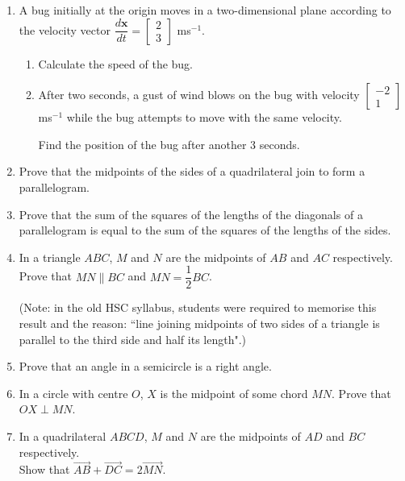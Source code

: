 \documentclass[11pt, a4paper, oneside]{exam}
\theoremstyle{definition}\newtheorem{define}{Definition}[section]
\theoremstyle{remark}\newtheorem{remark}{Remark}
\theoremstyle{definition}\newtheorem{example}{Example}[subsection]
\theoremstyle{definition}\newtheorem{notation}{Notation}[section]
\theoremstyle{definition}\newtheorem{theorem}{Theorem}[section]
\theoremstyle{definition}\newtheorem{corollary}{Corollary}[section]
\begin{document}
\begin{enumerate}
\item
A bug initially at the origin moves in a two-dimensional plane according to the velocity vector $\dfrac{d\mathbf{x}}{dt} = \left[ \begin{matrix}2\\3\end{matrix} \right]$ ms$^{-1}$.
\begin{enumerate}
  \item Calculate the speed of the bug.
  \item After two seconds, a gust of wind blows on the bug with velocity $\left[ \begin{matrix} -2\\1\end{matrix} \right]$ ms$^{-1}$ while the bug attempts to move with the same velocity.

  Find the position of the bug after another 3 seconds.
\end{enumerate}


\item Prove that the midpoints of the sides of a quadrilateral join to form a parallelogram.\\

\item Prove that the sum of the squares of the lengths of the diagonals of a parallelogram is equal to the sum of the squares of the lengths of the sides.\\

\item In a triangle $ABC$, $M$ and $N$ are the midpoints of $AB$ and $AC$ respectively. \\Prove that $MN \parallel BC$ and $MN = \dfrac{1}{2}BC$.

(Note: in the old HSC syllabus, students were required to memorise this result and the reason: ``line joining midpoints of two sides of a triangle is parallel to the third side and half its length".)\\

\item Prove that an angle in a semicircle is a right angle.\\

\item In a circle with centre $O$, $X$ is the midpoint of some chord $MN$. Prove that $OX \perp MN$.\\

\item In a quadrilateral $ABCD$, $M$ and $N$ are the midpoints of $AD$ and $BC$ respectively.\\
Show that $\overrightarrow{AB} + \overrightarrow{DC} = 2\overrightarrow{MN}$.\\


\end{enumerate}
\end{document}
